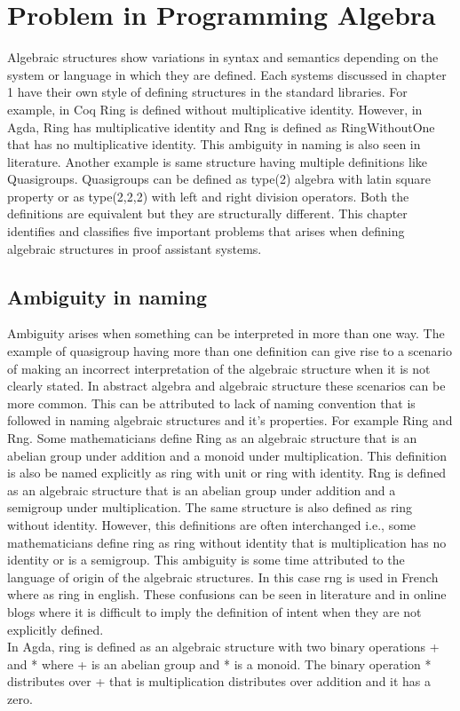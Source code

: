 \chapter{Problem in Programming Algebra}

Algebraic structures show variations in syntax and semantics depending on the system or language in which they are defined. Each systems discussed in chapter 1 have their own style of defining structures in the standard libraries. For example, in Coq Ring is defined without multiplicative identity. However, in Agda, Ring has multiplicative identity and Rng is defined as RingWithoutOne that has no multiplicative identity. This ambiguity in naming is also seen in literature. Another example is same structure having multiple definitions like Quasigroups. Quasigroups can be defined as type(2) algebra with latin square property or as type(2,2,2) with left and right division operators. Both the definitions are equivalent but they are structurally different. This chapter identifies and classifies five important problems that arises when defining algebraic structures in proof assistant systems. 

\section{Ambiguity in naming}
Ambiguity arises when something can be interpreted in more than one way. The example of quasigroup having more than one definition can give rise to a scenario of making an incorrect interpretation of the algebraic structure when it is not clearly stated. In abstract algebra and algebraic structure these scenarios can be more common. This can be attributed to lack of naming convention that is followed in naming algebraic structures and it's properties. For example Ring and Rng. Some mathematicians define Ring as an algebraic structure that is an abelian group under addition and a monoid under multiplication. This definition is also be named explicitly as ring with unit or ring with identity. Rng is defined as an algebraic structure that is an abelian group under addition and a semigroup under multiplication. The same structure is also defined as ring without identity. However, this definitions are often interchanged i.e., some mathematicians define ring as ring without identity that is multiplication has no identity or is a semigroup. This ambiguity is some time attributed to the language of origin of the algebraic structures. In this case rng is used in French where as ring in english. These confusions can be seen in literature and in online blogs where it is difficult to imply the definition of intent when they are not explicitly defined. \\
In Agda, ring is defined as an algebraic structure with two binary operations + and * where + is an abelian group and * is a monoid. The binary operation * distributes over + that is multiplication distributes over addition and it has a zero.\\

